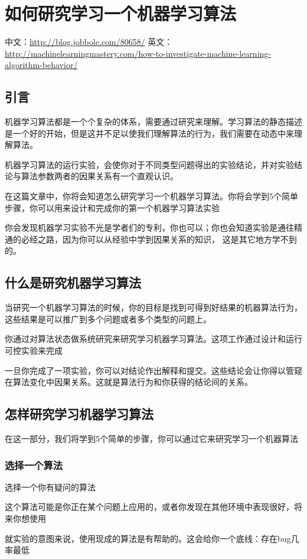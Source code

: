 
\chapter{如何研究学习一个机器学习算法}
中文：\url{http://blog.jobbole.com/80658/}
英文：\url{http://machinelearningmastery.com/how-to-investigate-machine-learning-algorithm-behavior/}
\section{引言}
机器学习算法都是一个个复杂的体系，需要通过研究来理解。学习算法的静态描述是一个好的开始，但是这并不足以使我们理解算法的行为，我们需要在动态中来理解算法。

机器学习算法的运行实验，会使你对于不同类型问题得出的实验结论，并对实验结论与算法参数两者的因果关系有一个直观认识。

在这篇文章中，你将会知道怎么研究学习一个机器学习算法。你将会学到5个简单步骤，你可以用来设计和完成你的第一个机器学习算法实验

你会发现机器学习实验不光是学者们的专利，你也可以；你也会知道实验是通往精通的必经之路，因为你可以从经验中学到因果关系的知识， 这是其它地方学不到的。

\section{什么是研究机器学习算法}
当研究一个机器学习算法的时候，你的目标是找到可得到好结果的机器算法行为，这些结果是可以推广到多个问题或者多个类型的问题上。

你通过对算法状态做系统研究来研究学习机器学习算法。这项工作通过设计和运行可控实验来完成

一旦你完成了一项实验，你可以对结论作出解释和提交。这些结论会让你得以管窥在算法变化中因果关系。这就是算法行为和你获得的结论间的关系。

\section{怎样研究学习机器学习算法}
在这一部分，我们将学到5个简单的步骤，你可以通过它来研究学习一个机器算法
\subsection{选择一个算法}
选择一个你有疑问的算法

这个算法可能是你正在某个问题上应用的，或者你发现在其他环境中表现很好，将来你想使用

就实验的意图来说，使用现成的算法是有帮助的。这会给你一个底线：存在bug几率最低

